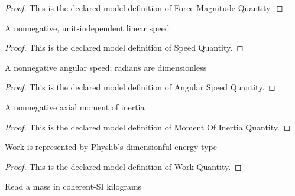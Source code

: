 \begin{proof}
  This is the declared model definition of Force Magnitude Quantity.
\end{proof}
\begin{definition}
  \label{def:physics:phyx-mini-0820:phyxminiproblems-problemphyxmini0820-speedquantity}
  A nonnegative, unit-independent linear speed
\end{definition}
\begin{proof}
  This is the declared model definition of Speed Quantity.
\end{proof}
\begin{definition}
  \label{def:physics:phyx-mini-0820:phyxminiproblems-problemphyxmini0820-angularspeedquantity}
  A nonnegative angular speed; radians are dimensionless
\end{definition}
\begin{proof}
  This is the declared model definition of Angular Speed Quantity.
\end{proof}
\begin{definition}
  \label{def:physics:phyx-mini-0820:phyxminiproblems-problemphyxmini0820-momentofinertiaquantity}
  A nonnegative axial moment of inertia
\end{definition}
\begin{proof}
  This is the declared model definition of Moment Of Inertia Quantity.
\end{proof}
\begin{definition}
  \label{def:physics:phyx-mini-0820:phyxminiproblems-problemphyxmini0820-workquantity}
  Work is represented by Physlib's dimensionful energy type
\end{definition}
\begin{proof}
  This is the declared model definition of Work Quantity.
\end{proof}
\begin{definition}
  \label{def:physics:phyx-mini-0820:phyxminiproblems-problemphyxmini0820-massinkilograms}
  Read a mass in coherent-SI kilograms
\end{definition}
